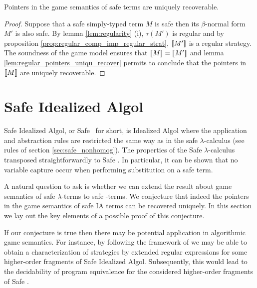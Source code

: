 \begin{thm}
Pointers in the game semantics of safe terms are uniquely recoverable.
\end{thm}
\begin{proof}
Suppose that a safe simply-typed term $M$ is safe then its $\beta$-normal form $M'$ is also safe.
By lemma \ref{lem:regularity} (i), $\tau(M')$ is regular and
by proposition \ref{prop:regular_comp_imp_regular_strat},
${[\![ M' ]\!]}$ is a regular strategy.
The soundness of the game model ensures that ${[\![ M ]\!]} = {[\![ M' ]\!]}$ and lemma \ref{lem:regular_pointers_uniqu_recover} permits
to conclude that the pointers in ${[\![ M ]\!]}$ are uniquely recoverable.
\end{proof}



\section{Safe Idealized Algol}

Safe Idealized Algol, or Safe \ialgol\ for short, is Idealized Algol where the application and abstraction rules are restricted
the same way as in the safe $\lambda$-calculus (see rules of section \ref{sec:safe_nonhomog}).
The properties of the Safe $\lambda$-calculus transposed straightforwardly to Safe \ialgol. In particular, it can be shown that
no variable capture occur when performing substitution on a safe term.

A natural question to ask is whether we can extend the result about game semantics of safe $\lambda$-terms to safe \ialgol-terms.
We conjecture that indeed the pointers in the game semantics of safe IA terms can be recovered uniquely.
In this section we lay out the key elements of a possible proof of this conjecture.

If our conjecture is true then there may be potential application in algorithmic game semantics.
For instance, by following the framework of \cite{ghicamccusker00} we may be able to obtain a characterization of strategies
by extended regular expressions for some higher-order fragments of Safe Idealized Algol.
Subsequently, this would lead to the decidability of program equivalence
for the considered higher-order fragments of Safe \ialgol.

